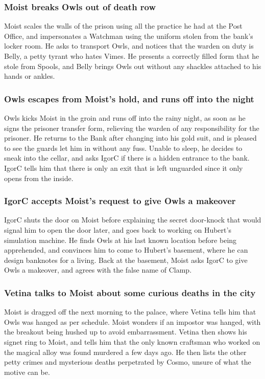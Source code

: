 \subsubsection{\Gls{Moist} breaks \Gls{Owls} out of death row}
\Gls{Moist} scales the walls of the prison using all the practice he had at the Post Office, and
impersonates a Watchman using the uniform stolen from the bank's locker room. He asks to transport
\Gls{Owls}, and notices that the warden on duty is \Gls{Belly}, a petty tyrant who hates
\Gls{Vimes}. He presents a correctly filled form that he stole from \Gls{Spools}, and \Gls{Belly}
brings \Gls{Owls} out without any shackles attached to his hands or ankles.

\subsubsection{\Gls{Owls} escapes from \Gls{Moist}'s hold, and runs off into the night}
\Gls{Owls} kicks \Gls{Moist} in the groin and runs off into the rainy night, as soon as he signs the
prisoner transfer form, relieving the warden of any responsibility for the prisoner. He returns to
the Bank after changing into his gold suit, and is pleased to see the guards let him in without any
fuss. Unable to sleep, he decides to sneak into the cellar, and asks \Gls{IgorC} if there is a
hidden entrance to the bank. \Gls{IgorC} tells him that there is only an exit that is left unguarded
since it only opens from the inside.

\subsubsection{\Gls{IgorC} accepts \Gls{Moist}'s request to give \Gls{Owls} a makeover}
\Gls{IgorC} shuts the door on \Gls{Moist} before explaining the secret door-knock that would
signal him to open the door later, and goes back to working on \Gls{Hubert}'s simulation machine.
He finds \Gls{Owls} at his last known location before being apprehended, and convinces him to come
to \Gls{Hubert}'s basement, where he can design banknotes for a living. Back at the basement,
\Gls{Moist} asks \Gls{IgorC} to give \Gls{Owls} a makeover, and agrees with the false name of
\Gls{Clamp}.

\subsubsection{\Gls{Vetina} talks to \Gls{Moist} about some curious deaths in the city}
\Gls{Moist} is dragged off the next morning to the palace, where \Gls{Vetina} tells him that
\Gls{Owls} was hanged as per schedule. \Gls{Moist} wonders if an impostor was hanged, with the
breakout being hushed up to avoid embarrassment. \Gls{Vetina} then shows his signet ring to
\Gls{Moist}, and tells him that the only known craftsman who worked on the magical alloy was found
murdered a few days ago. He then lists the other petty crimes and mysterious deaths perpetrated by
\Gls{Cosmo}, unsure of what the motive can be.

